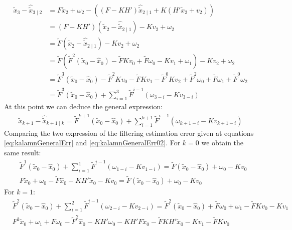 \documentclass[oneside,12pt]{article}
\begin{document}
\begin{equation}
    \begin{split}
        \tilde{x}_{3} - \hat{\tilde{x}}_{3 \mid 2} &= F \tilde{x}_2 + \omega_2 - ((F-KH')\hat{\tilde{x}}_{2 \mid 1} + K(H'\tilde{x}_2 + v_2))\\
        &= (F-KH')(\tilde{x}_2 - \hat{\tilde{x}}_{2 \mid 1}) - Kv_2 + \omega_2\\
        &=  \tilde{F}(\tilde{x}_2 - \hat{\tilde{x}}_{2 \mid 1}) - Kv_2 + \omega_2\\
        &=  \tilde{F}(\tilde{F}^2(\tilde{x}_0 - \hat{x}_0) - \tilde{F}Kv_0 + \tilde{F}\omega_0 - Kv_1 + \omega_1) - Kv_2 + \omega_2\\
        &=  \tilde{F}^3(\tilde{x}_0 - \hat{x}_0) - \tilde{F}^2Kv_0 - \tilde{F}Kv_1 - \tilde{F}^0Kv_2 + \tilde{F}^2\omega_0  + \tilde{F}\omega_1 + \tilde{F}^0\omega_2\\
        &=  \tilde{F}^3(\tilde{x}_0 - \hat{x}_0) + \sum_{i=1}^3 \tilde{F}^{i-1}(\omega_{3-i} - Kv_{3-i})
    \end{split}
\end{equation}
%
At this point we can deduce the general expression:
%
\begin{equation}\label{eq:kalamnGeneralErr02}
    \begin{split}
        \tilde{x}_{k+1} - \hat{\tilde{x}}_{k+1 \mid k} = \tilde{F}^{k+1}(\tilde{x}_0 - \hat{x}_0) + \sum_{i=1}^{k+1} \tilde{F}^{i-1}(\omega_{k+1-i} - Kv_{k+1-i})
    \end{split}
\end{equation}    
%
Comparing the two expression of the filtering estimation error given at equations \ref{eq:kalamnGeneralErr} and \ref{eq:kalamnGeneralErr02}. For $k=0$ we obtain the same result:
%
\begin{equation}
    \begin{split}
        &\tilde{F}^{1}(\tilde{x}_0 - \hat{x}_0) + \sum_{i=1}^{1} \tilde{F}^{i-1}(\omega_{1-i} - Kv_{1-i}) = \tilde{F}(\tilde{x}_0 - \hat{x}_0) + \omega_{0} - Kv_{0}\\
        &F \tilde{x}_0 + \omega_{0} - \tilde{F} \hat{x}_0 - K H' \tilde{x}_0 - K v_{0} = \tilde{F} (\tilde{x}_0 - \hat{x}_0) + \omega_{0} - K v_{0}
    \end{split}
\end{equation}
%
For $k=1$:
%
\begin{equation}
    \begin{split}
        &\tilde{F}^{2}(\tilde{x}_0 - \hat{x}_0) + \sum_{i=1}^{2} \tilde{F}^{i-1}(\omega_{2-i} - Kv_{2-i}) = \tilde{F}^{2}(\tilde{x}_0 - \hat{x}_0) + \tilde{F}\omega_{0} + \omega_{1} - \tilde{F}Kv_{0} - Kv_{1}\\ 
        &F^{2} \tilde{x}_0 + \omega_{1} + F \omega_{0}
        - \tilde{F}^{2} \hat{x}_0 
        - K H' \omega_{0}
        - K H' F \tilde{x}_0 
        - \tilde{F} K H' \tilde{x}_0 
        - K v_{1} - \tilde{F} K v_{0}
    \end{split}
\end{equation}
\end{document}

